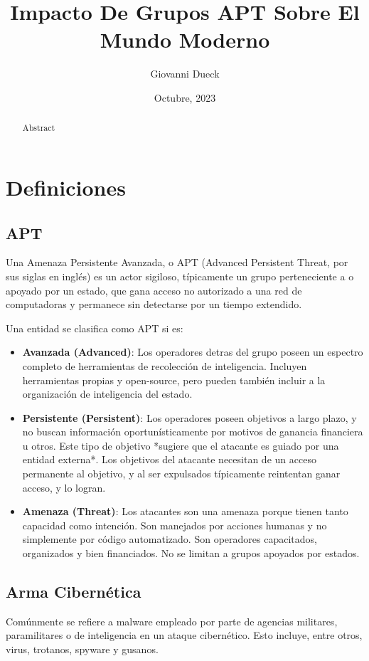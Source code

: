 \documentclass{article}
\title{Impacto De Grupos APT Sobre El Mundo Moderno}
\author{Giovanni Dueck}
\date{Octubre, 2023}
\begin{document}
\maketitle

\begin{abstract}
    Abstract
\end{abstract}

\section{Definiciones}
\subsection{APT}
Una Amenaza Persistente Avanzada, o APT (Advanced Persistent Threat, por sus siglas en inglés) es un actor sigiloso, típicamente un grupo perteneciente a o apoyado por un estado, que gana acceso no autorizado a una red de computadoras y permanece sin detectarse por un tiempo extendido.\autocite{itgov-apt} 

Una entidad se clasifica como APT si es:
\begin{itemize}
    \item {\bf Avanzada (Advanced)}: Los operadores detras del grupo poseen un espectro completo de herramientas de recolección de inteligencia. Incluyen herramientas propias y open-source, pero pueden también incluir a la organización de inteligencia del estado.
    \item {\bf Persistente (Persistent)}: Los operadores poseen objetivos a largo plazo, y no buscan información oportunísticamente por motivos de ganancia financiera u otros. Este tipo de objetivo *sugiere que el atacante es guiado por una entidad externa*. Los objetivos del atacante necesitan de un acceso permanente al objetivo, y al ser expulsados típicamente reintentan ganar acceso, y lo logran.
    \item {\bf Amenaza (Threat)}: Los atacantes son una amenaza porque tienen tanto capacidad como intención. Son manejados por acciones humanas y no simplemente por código automatizado. Son operadores capacitados, organizados y bien financiados. No se limitan a grupos apoyados por estados.
\end{itemize}

\subsection{Arma Cibernética}
Comúnmente se refiere a malware empleado por parte de agencias militares, paramilitares o de inteligencia en un ataque cibernético. Esto incluye, entre otros, virus, trotanos, spyware y gusanos.
\end{document}
